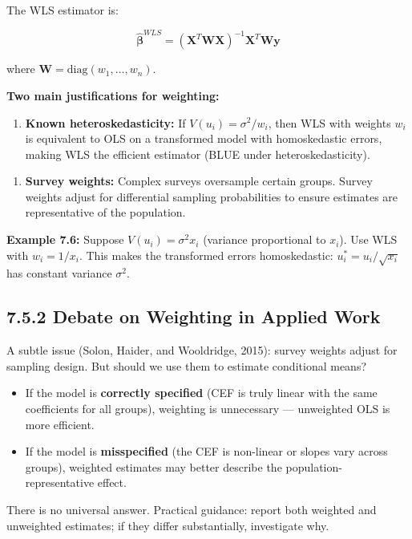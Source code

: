 The WLS estimator is:

\[
\hat{\boldsymbol{\beta}}^{WLS} = (\mathbf{X}^T \mathbf{W} \mathbf{X})^{-1} \mathbf{X}^T \mathbf{W} \mathbf{y}
\]

where $\mathbf{W} = \text{diag}(w_1, \ldots, w_n)$.

\textbf{Two main justifications for weighting:}

\begin{enumerate}
\item \textbf{Known heteroskedasticity:} If $V(u_i) = \sigma^2/w_i$, then WLS with weights $w_i$ is equivalent to OLS on a transformed model with homoskedastic errors, making WLS the efficient estimator (BLUE under heteroskedasticity).
\end{enumerate}

\begin{enumerate}
\item \textbf{Survey weights:} Complex surveys oversample certain groups. Survey weights adjust for differential sampling probabilities to ensure estimates are representative of the population.
\end{enumerate}

\textbf{Example 7.6:} Suppose $V(u_i) = \sigma^2 x_i$ (variance proportional to $x_i$). Use WLS with $w_i = 1/x_i$. This makes the transformed errors homoskedastic: $u_i^* = u_i/\sqrt{x_i}$ has constant variance $\sigma^2$.

\subsection{7.5.2 Debate on Weighting in Applied Work}

A subtle issue (Solon, Haider, and Wooldridge, 2015): survey weights adjust for sampling design. But should we use them to estimate conditional means?

\begin{itemize}
\item If the model is \textbf{correctly specified} (CEF is truly linear with the same coefficients for all groups), weighting is unnecessary --- unweighted OLS is more efficient.
\item If the model is \textbf{misspecified} (the CEF is non-linear or slopes vary across groups), weighted estimates may better describe the population-representative effect.
\end{itemize}

There is no universal answer. Practical guidance: report both weighted and unweighted estimates; if they differ substantially, investigate why.

